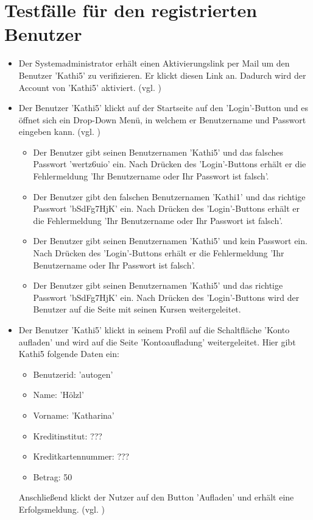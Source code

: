 \documentclass[a4paper]{scrreprt}
\newcounter{Lc}
\newcounter{Hc}
\newcommand{\stepHc}{\stepcounter{Hc}\setcounter{Lc}{0}}
\begin{document}
	\section{Testfälle für den registrierten Benutzer}
		\stepHc
		\begin{itemize}
			\item {}
			Der Systemadministrator erhält einen Aktivierungslink per Mail um den Benutzer 'Kathi5' zu verifizieren. Er klickt diesen Link an. Dadurch wird der Account von 'Kathi5' aktiviert. (vgl. )
			
			\item {} 
			Der Benutzer 'Kathi5' klickt auf der Startseite	auf den 'Login'-Button und es öffnet sich ein Drop-Down Menü, in welchem er Benutzername und Passwort eingeben kann. (vgl. )
			\begin{itemize}
				\item Der Benutzer gibt seinen Benutzernamen 'Kathi5' und das falsches Passwort 'wertz6uio' ein. Nach Drücken des 'Login'-Buttons erhält er die Fehlermeldung 'Ihr Benutzername oder Ihr Passwort ist falsch'.
				\item Der Benutzer gibt den falschen Benutzernamen 'Kathi1' und das richtige Passwort 'bSdFg7HjK' ein. Nach Drücken des 'Login'-Buttons erhält er die Fehlermeldung 'Ihr Benutzername oder Ihr Passwort ist falsch'.
				\item Der Benutzer gibt seinen Benutzernamen 'Kathi5' und kein Passwort ein. Nach Drücken des 'Login'-Buttons erhält er die Fehlermeldung 'Ihr Benutzername oder Ihr Passwort ist falsch'.
				\item Der Benutzer gibt seinen Benutzernamen 'Kathi5' und das richtige Passwort 'bSdFg7HjK' ein. Nach Drücken des 'Login'-Buttons wird der Benutzer auf die Seite mit seinen Kursen weitergeleitet.
			\end{itemize} 
			
			\item {} 
			Der Benutzer 'Kathi5' klickt in seinem Profil auf die Schaltfläche 'Konto aufladen' und wird auf die Seite 'Kontoaufladung' weitergeleitet. Hier gibt Kathi5 folgende Daten ein:
				 \begin{itemize}
				 	\item Benutzerid: 'autogen'
				 	\item Name: 'Hölzl'
				 	\item Vorname: 'Katharina'
				 	\item Kreditinstitut: ???
				 	\item Kreditkartennummer: ???
				 	\item Betrag: 50 
				 \end{itemize}	
			Anschließend klickt der Nutzer auf den Button 'Aufladen' und erhält eine Erfolgsmeldung.  (vgl. )
			\end{itemize}
			
\end{document}

